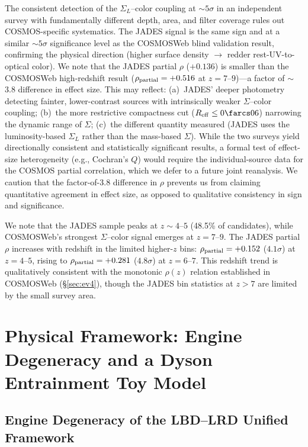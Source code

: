 \documentclass[twocolumn,linenumbers]{aastex631}
\begin{document}
The consistent detection of the $\Sigma_L$--color coupling at ${\sim}5\sigma$ in an independent survey with fundamentally different depth, area, and filter coverage rules out COSMOS-specific systematics. The JADES signal is the same sign and at a similar ${\sim}5\sigma$ significance level as the COSMOSWeb blind validation result, confirming the physical direction (higher surface density $\rightarrow$ redder rest-UV-to-optical color). We note that the JADES partial $\rho$ ($+0.136$) is smaller than the COSMOSWeb high-redshift result ($\rho_{\rm partial} = +0.516$ at $z=7$--$9$)---a factor of $\sim$3.8 difference in effect size. This may reflect: (a)~JADES' deeper photometry detecting fainter, lower-contrast sources with intrinsically weaker $\Sigma$--color coupling; (b)~the more restrictive compactness cut ($R_{\rm eff} \leq 0\farcs06$) narrowing the dynamic range of $\Sigma$; (c)~the different quantity measured (JADES uses the luminosity-based $\Sigma_L$ rather than the mass-based $\Sigma$). While the two surveys yield directionally consistent and statistically significant results, a formal test of effect-size heterogeneity (e.g., Cochran's $Q$) would require the individual-source data for the COSMOS partial correlation, which we defer to a future joint reanalysis. We caution that the factor-of-3.8 difference in $\rho$ prevents us from claiming quantitative agreement in effect size, as opposed to qualitative consistency in sign and significance.

We note that the JADES sample peaks at $z \sim 4$--$5$ (48.5\% of candidates), while COSMOSWeb's strongest $\Sigma$--color signal emerges at $z=7$--$9$. The JADES partial $\rho$ increases with redshift in the limited higher-$z$ bins: $\rho_{\rm partial} = +0.152$ ($4.1\sigma$) at $z=4$--$5$, rising to $\rho_{\rm partial} = +0.281$ ($4.8\sigma$) at $z=6$--$7$. This redshift trend is qualitatively consistent with the monotonic $\rho(z)$ relation established in COSMOSWeb (\S\ref{sec:ev4}), though the JADES bin statistics at $z>7$ are limited by the small survey area.

\section{Physical Framework: Engine Degeneracy and a Dyson Entrainment Toy Model} \label{sec:physics}

\subsection{Engine Degeneracy of the LBD--LRD Unified Framework}
\end{document}
